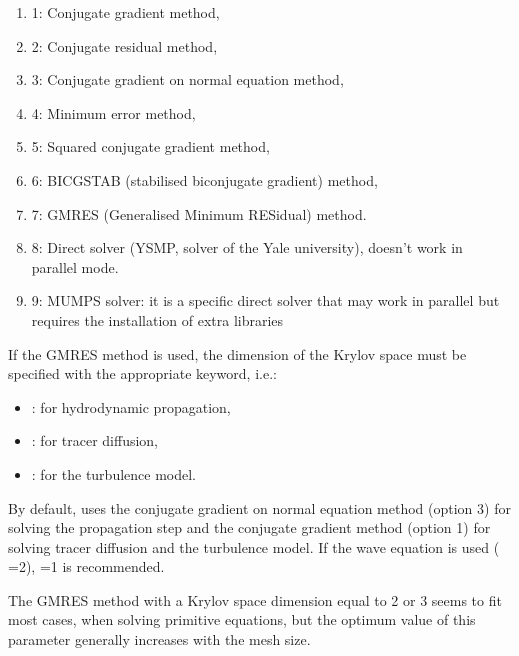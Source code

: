 \begin{enumerate}
\item [\nonumber] 1: Conjugate gradient method,

\item [\nonumber] 2: Conjugate residual method,

\item [\nonumber] 3: Conjugate gradient on normal equation method,

\item [\nonumber] 4: Minimum error method,

\item [\nonumber] 5: Squared conjugate gradient method,

\item [\nonumber] 6: BICGSTAB (stabilised biconjugate gradient) method,

\item [\nonumber] 7: GMRES (Generalised Minimum RESidual) method.

\item [\nonumber] 8: Direct solver (YSMP, solver of the Yale university), doesn't work in parallel mode.

\item [\nonumber] 9: MUMPS solver: it is a specific direct solver that may work in parallel but requires the installation of extra libraries
\end{enumerate}

 If the GMRES method is used, the dimension of the Krylov space must be specified with the appropriate keyword, i.e.:

\begin{itemize}
\item  {}: for hydrodynamic propagation,

\item  {}: for tracer diffusion,

\item  {}: for the turbulence model.
\end{itemize}

 By default,  uses the conjugate gradient on normal equation method (option 3) for solving the propagation step and the conjugate gradient method (option 1) for solving tracer diffusion and the turbulence model. If the wave equation is used ( =2),  =1 is recommended.

 The GMRES method with a Krylov space dimension equal to 2 or 3 seems to fit most cases, when solving primitive equations, but the optimum value of this parameter generally increases with the mesh size.

